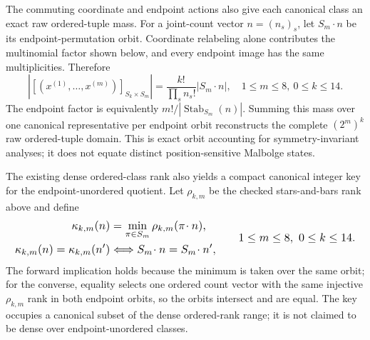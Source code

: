 \documentclass{article}
\newcommand{\fitmath}[1]{\resizebox{0.99\linewidth}{!}{$\displaystyle #1$}}
\begin{document}
The commuting coordinate and endpoint actions also give each canonical class an
exact raw ordered-tuple mass. For a joint-count vector $n=(n_s)_s$, let
$S_m\!\cdot n$ be its endpoint-permutation orbit. Coordinate relabeling alone
contributes the multinomial factor shown below, and every endpoint image has the
same multiplicities. Therefore
\begin{equation}
  \left|[(x^{(1)},\ldots,x^{(m)})]_{S_k\times S_m}\right|
    =\frac{k!}{\prod_s n_s!}\left|S_m\!\cdot n\right|,
  \quad 1\leq m\leq8,\ 0\leq k\leq14.
  \label{eq:optimization-crazy-preimage-cube-unordered-tuple-orbit-mass}
\end{equation}
The endpoint factor is equivalently
$ m!/|\operatorname{Stab}_{S_m}(n)| $. Summing this mass over one canonical
representative per endpoint orbit
reconstructs the complete $(2^m)^k$ raw ordered-tuple domain. This is exact
orbit accounting for symmetry-invariant analyses; it does not equate distinct
position-sensitive Malbolge states.

The existing dense ordered-class rank also yields a compact canonical integer
key for the endpoint-unordered quotient. Let $\rho_{k,m}$ be the checked
stars-and-bars rank above and define
\begin{equation}
  \fitmath{%
    \begin{aligned}
      \kappa_{k,m}(n)&=\min_{\pi\in S_m}\rho_{k,m}(\pi\!\cdot n),\\
      \kappa_{k,m}(n)=\kappa_{k,m}(n')
        &\Longleftrightarrow S_m\!\cdot n=S_m\!\cdot n',
    \end{aligned}
    \qquad 1\leq m\leq8,\ 0\leq k\leq14.
  }
  \label{eq:optimization-crazy-preimage-cube-unordered-tuple-canonical-rank}
\end{equation}
The forward implication holds because the minimum is taken over the same orbit;
for the converse, equality selects one ordered count vector with the same
injective $\rho_{k,m}$ rank in both endpoint orbits, so the orbits intersect and
are equal. The key occupies a canonical subset of the dense ordered-rank range;
it is not claimed to be dense over endpoint-unordered classes.
\end{document}
